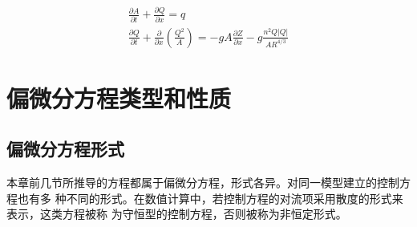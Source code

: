                                                                 \begin{equation}
                                                                  \begin{gathered}
                                                                    \frac{\partial A}{\partial t}
                                                                    +
                                                                    \frac{\partial Q}{\partial x}
                                                                    =
                                                                    q
                                                                    \\
                                                                    \frac{\partial Q}{\partial t}
                                                                    +
                                                                    \frac{\partial}{\partial x}\left(\frac{Q^{2}}{A}\right)
                                                                    =
                                                                    -
                                                                    gA\frac{\partial Z}{\partial x}
                                                                    -
                                                                    g\frac{n^{2}Q|Q|}{AR^{4/3}}
                                                                  \end{gathered}
                                                                  \label{EqCGe_SV_AQ_2}
                                                                \end{equation}

                                                                \section{偏微分方程类型和性质}
                                                                \subsection{偏微分方程形式}
                                                                本章前几节所推导的方程都属于偏微分方程，形式各异。对同一模型建立的控制方程也有多
                                                                种不同的形式。在数值计算中，若控制方程的对流项采用散度的形式来表示，这类方程被称
                                                                为守恒型的控制方程，否则被称为非恒定形式。


